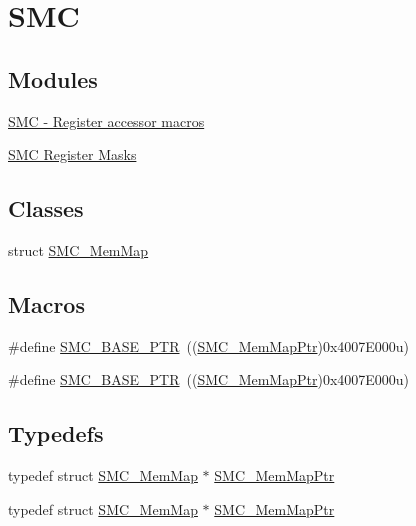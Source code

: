 \hypertarget{group___s_m_c___peripheral}{}\section{S\+MC}
\label{group___s_m_c___peripheral}
\subsection*{Modules}
\begin{DoxyCompactItemize}
\item 
\hyperlink{group___s_m_c___register___accessor___macros}{S\+M\+C -\/ Register accessor macros}
\item 
\hyperlink{group___s_m_c___register___masks}{S\+M\+C Register Masks}
\end{DoxyCompactItemize}
\subsection*{Classes}
\begin{DoxyCompactItemize}
\item 
struct \hyperlink{struct_s_m_c___mem_map}{S\+M\+C\+\_\+\+Mem\+Map}
\end{DoxyCompactItemize}
\subsection*{Macros}
\begin{DoxyCompactItemize}
\item 
\#define \hyperlink{group___s_m_c___peripheral_ga31b6c4571795341e6446800243313e56}{S\+M\+C\+\_\+\+B\+A\+S\+E\+\_\+\+P\+TR}~((\hyperlink{group___s_m_c___peripheral_ga763f87a6b8ebab7acb6dde639e6a47c7}{S\+M\+C\+\_\+\+Mem\+Map\+Ptr})0x4007\+E000u)
\item 
\#define \hyperlink{group___s_m_c___peripheral_ga31b6c4571795341e6446800243313e56}{S\+M\+C\+\_\+\+B\+A\+S\+E\+\_\+\+P\+TR}~((\hyperlink{group___s_m_c___peripheral_ga763f87a6b8ebab7acb6dde639e6a47c7}{S\+M\+C\+\_\+\+Mem\+Map\+Ptr})0x4007\+E000u)
\end{DoxyCompactItemize}
\subsection*{Typedefs}
\begin{DoxyCompactItemize}
\item 
typedef struct \hyperlink{struct_s_m_c___mem_map}{S\+M\+C\+\_\+\+Mem\+Map} $\ast$ \hyperlink{group___s_m_c___peripheral_ga763f87a6b8ebab7acb6dde639e6a47c7}{S\+M\+C\+\_\+\+Mem\+Map\+Ptr}
\item 
typedef struct \hyperlink{struct_s_m_c___mem_map}{S\+M\+C\+\_\+\+Mem\+Map} $\ast$ \hyperlink{group___s_m_c___peripheral_ga763f87a6b8ebab7acb6dde639e6a47c7}{S\+M\+C\+\_\+\+Mem\+Map\+Ptr}
\end{DoxyCompactItemize}


